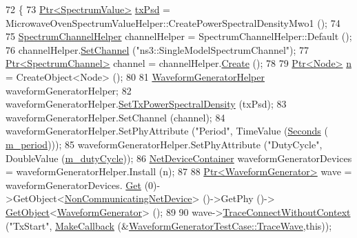 \begin{DoxyCode}
72 \{
73   \hyperlink{classns3_1_1Ptr}{Ptr<SpectrumValue>} \hyperlink{lte__link__budget_8m_a684fe3101a5e48a5fcc57cab8dbcd1aa}{txPsd} = 
      MicrowaveOvenSpectrumValueHelper::CreatePowerSpectralDensityMwo1 ();
74 
75   \hyperlink{classns3_1_1SpectrumChannelHelper}{SpectrumChannelHelper} channelHelper = SpectrumChannelHelper::Default ();
76   channelHelper.\hyperlink{classns3_1_1SpectrumChannelHelper_a11ffe86edea8cdd30f181e41c0e3e29f}{SetChannel} (\textcolor{stringliteral}{"ns3::SingleModelSpectrumChannel"});
77   \hyperlink{classns3_1_1Ptr}{Ptr<SpectrumChannel>} channel = channelHelper.\hyperlink{classns3_1_1SpectrumChannelHelper_a419ea84f5046763085f94f38af319fb9}{Create} ();
78 
79   \hyperlink{classns3_1_1Ptr}{Ptr<Node>} \hyperlink{namespacesample-rng-plot_aeb5ee5c431e338ef39b7ac5431242e1d}{n} = CreateObject<Node> ();
80 
81   \hyperlink{classns3_1_1WaveformGeneratorHelper}{WaveformGeneratorHelper} waveformGeneratorHelper;
82   waveformGeneratorHelper.\hyperlink{classns3_1_1WaveformGeneratorHelper_a1c76759d1f262edec838f1475893ce70}{SetTxPowerSpectralDensity} (txPsd);
83   waveformGeneratorHelper.SetChannel (channel);
84   waveformGeneratorHelper.SetPhyAttribute (\textcolor{stringliteral}{"Period"}, TimeValue (\hyperlink{group__timecivil_ga33c34b816f8ff6628e33d5c8e9713b9e}{Seconds} (
      \hyperlink{classWaveformGeneratorTestCase_a06cd8548960215ff413acaff8e72631e}{m\_period})));
85   waveformGeneratorHelper.SetPhyAttribute (\textcolor{stringliteral}{"DutyCycle"}, DoubleValue (\hyperlink{classWaveformGeneratorTestCase_aeabd37e15d4d2ca22851c2a824d63752}{m\_dutyCycle}));
86   \hyperlink{classns3_1_1NetDeviceContainer}{NetDeviceContainer} waveformGeneratorDevices = waveformGeneratorHelper.Install (n);
87 
88   \hyperlink{classns3_1_1Ptr}{Ptr<WaveformGenerator>} wave = waveformGeneratorDevices.
      \hyperlink{classns3_1_1NetDeviceContainer_a677d62594b5c9d2dea155cc5045f4d0b}{Get} (0)->GetObject<\hyperlink{classns3_1_1NonCommunicatingNetDevice}{NonCommunicatingNetDevice}> ()->GetPhy ()->
      \hyperlink{classns3_1_1Object_a13e18c00017096c8381eb651d5bd0783}{GetObject}<\hyperlink{classns3_1_1WaveformGenerator}{WaveformGenerator}> ();
89 
90   wave->\hyperlink{classns3_1_1ObjectBase_a1be45f6fd561e75dcac9dfa81b2b81e4}{TraceConnectWithoutContext} (\textcolor{stringliteral}{"TxStart"}, 
      \hyperlink{group__makecallbackmemptr_ga9376283685aa99d204048d6a4b7610a4}{MakeCallback} (&\hyperlink{classWaveformGeneratorTestCase_aa5684138161b52c395232f379dba4ad4}{WaveformGeneratorTestCase::TraceWave},\textcolor{keyword}{this}));

\end{DoxyCode}
